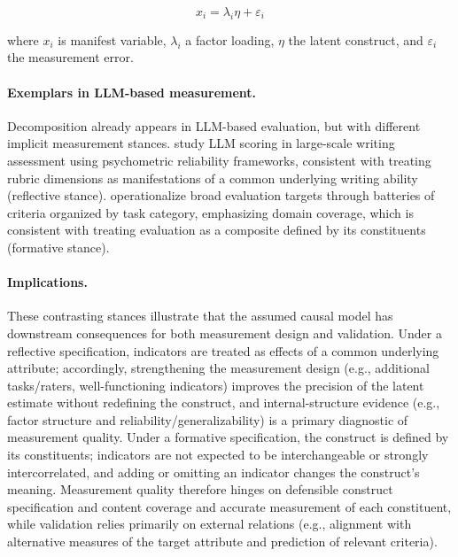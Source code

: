 \begin{equation}\label{eq:reflective_model}
    x_i = \lambda_i \eta + \varepsilon_i
\end{equation}

where $x_i$ is manifest variable, $\lambda_i$ a factor loading, $\eta$ the latent construct, and $\varepsilon_i$ the measurement error.


\paragraph{Exemplars in LLM-based measurement.}

Decomposition already appears in LLM-based evaluation, but with different implicit measurement stances. \citet{wang2025evaluating} study LLM scoring in large-scale writing assessment using psychometric reliability frameworks, consistent with treating rubric dimensions as manifestations of a common underlying writing ability (reflective stance). \citet{li-fine-grained-2026} operationalize broad evaluation targets through batteries of criteria organized by task category, emphasizing domain coverage, which is consistent with treating evaluation as a composite defined by its constituents (formative stance). 


\paragraph{Implications.}
These contrasting stances illustrate that the assumed causal model has downstream consequences for both measurement design and validation. Under a reflective specification, indicators are treated as effects of a common underlying attribute; accordingly, strengthening the measurement design (e.g., additional tasks/raters, well-functioning indicators) improves the precision of the latent estimate without redefining the construct, and internal-structure evidence (e.g., factor structure and reliability/generalizability) is a primary diagnostic of measurement quality. Under a formative specification, the construct is defined by its constituents; indicators are not expected to be interchangeable or strongly intercorrelated, and adding or omitting an indicator changes the construct’s meaning. Measurement quality therefore hinges on defensible construct specification and content coverage and accurate measurement of each constituent, while validation relies primarily on external relations (e.g., alignment with alternative measures of the target attribute and prediction of relevant criteria).


